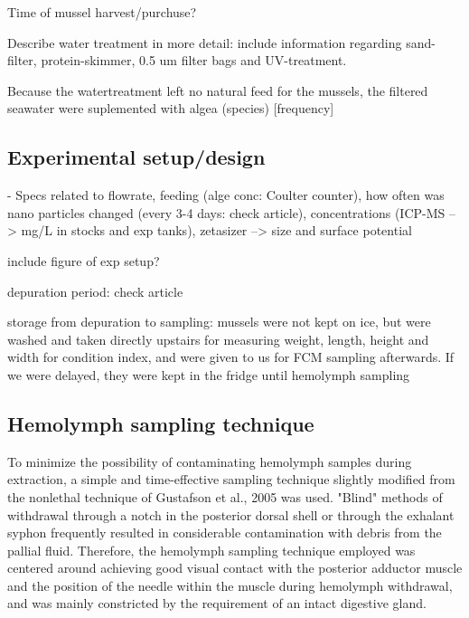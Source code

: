 Time of mussel harvest/purchuse?

Describe water treatment in more detail: include information regarding sand-filter, protein-skimmer, 0.5 um filter bags and UV-treatment.

Because the watertreatment left no natural feed for the mussels, the filtered seawater were suplemented with algea (species) [frequency]


\subsection{Experimental setup/design}
- Specs related to flowrate, feeding (alge conc: Coulter counter), how often was nano particles changed (every 3-4 days: check article), concentrations (ICP-MS --> mg/L in stocks and exp tanks), zetasizer --> size and surface potential

include figure of exp setup?

depuration period: check article

storage from depuration to sampling: mussels were not kept on ice, but were washed and taken directly upstairs for measuring weight, length, height and width for condition index, and were given to us for FCM sampling afterwards. If we were delayed, they were kept in the fridge until hemolymph sampling 

\subsection{Hemolymph sampling technique}
To minimize the possibility of contaminating hemolymph samples during extraction, a simple and time-effective sampling technique slightly modified from the nonlethal technique of Gustafson et al., 2005 was used. "Blind" methods of withdrawal through a notch in the posterior dorsal shell or through the exhalant syphon frequently resulted in considerable contamination with debris from the pallial fluid. Therefore, the hemolymph sampling technique employed was centered around achieving good visual contact with the posterior adductor muscle and the position of the needle within the muscle during hemolymph withdrawal, and was mainly constricted by the requirement of an intact digestive gland.


